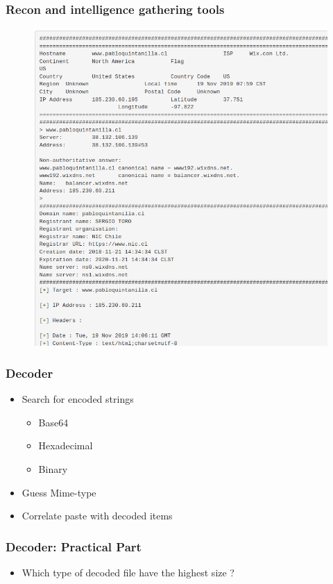 \documentclass{beamer}
\begin{document}
\begin{frame}
    \frametitle{Recon and intelligence gathering tools}
        \begin{figure}
            \includegraphics[scale=0.4]{images/recon-paste.png}
        \end{figure}
\end{frame}


\begin{frame}
    \frametitle{Decoder}
    \begin{itemize}
    	\item Search for encoded strings
    		\begin{itemize}
				\item Base64
				\item Hexadecimal
				\item Binary
			\end{itemize}
    	\item Guess Mime-type
    	\item Correlate paste with decoded items
    \end{itemize}
\end{frame}

\begin{frame}
    \frametitle{Decoder: Practical Part}
    \begin{itemize}
    	\item[] Which type of decoded file have the highest size ?
    \end{itemize}
\end{frame}
\end{document}
